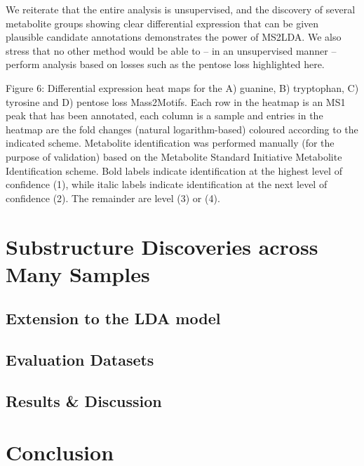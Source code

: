We reiterate that the entire analysis is unsupervised, and the discovery of several metabolite groups showing clear differential expression that can be given plausible candidate annotations demonstrates the power of MS2LDA. We also stress that no other method would be able to – in an unsupervised manner – perform analysis based on losses such as the pentose loss highlighted here. 

Figure 6: Differential expression heat maps for the A) guanine, B) tryptophan, C) tyrosine and D) pentose loss Mass2Motifs. Each row in the heatmap is an MS1 peak that has been annotated, each column is a sample and entries in the heatmap are the fold changes (natural logarithm-based) coloured according to the indicated scheme. Metabolite identification was performed manually (for the purpose of validation) based on the Metabolite Standard Initiative Metabolite Identification scheme. Bold labels indicate identification at the highest level of confidence (1), while italic labels indicate identification at the next level of confidence (2). The remainder are level (3) or (4).

\section{Substructure Discoveries across Many Samples}

\subsection{Extension to the LDA model}

\subsection{Evaluation Datasets}

\subsection{Results \& Discussion}

\section{Conclusion}
